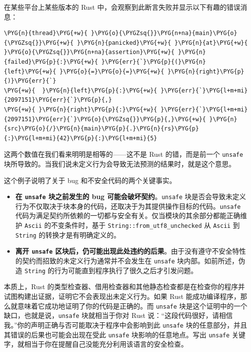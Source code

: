 在某些平台上某些版本的 Rust 中，会观察到此断言失败并显示以下有趣的错误消息：

\begin{Verbatim}[commandchars=\\\{\},breaklines=true,breakanywhere=true,fontsize=\codefont,xleftmargin=17bp]
\PYG{n}{thread}\PYG{+w}{ }\PYG{o}{\PYGZsq{}}\PYG{n+na}{main}\PYG{o}{\PYGZsq{}}\PYG{+w}{ }\PYG{n}{panicked}\PYG{+w}{ }\PYG{n}{at}\PYG{+w}{ }\PYG{o}{\PYGZsq{}}\PYG{n+na}{assertion}\PYG{+w}{ }\PYG{n}{failed}\PYG{p}{:}\PYG{+w}{ }\PYG{err}{`}\PYG{p}{(}\PYG{n}{left}\PYG{+w}{ }\PYG{o}{=}\PYG{o}{=}\PYG{+w}{ }\PYG{n}{right}\PYG{p}{)}\PYG{err}{`}
\PYG{+w}{  }\PYG{n}{left}\PYG{p}{:}\PYG{+w}{ }\PYG{err}{`}\PYG{l+m+mi}{2097151}\PYG{err}{`}\PYG{p}{,}
\PYG{+w}{ }\PYG{n}{right}\PYG{p}{:}\PYG{+w}{ }\PYG{err}{`}\PYG{l+m+mi}{2097151}\PYG{err}{`}\PYG{o}{\PYGZsq{}}\PYG{p}{,}\PYG{+w}{ }\PYG{n}{src}\PYG{o}{/}\PYG{n}{main}\PYG{p}{.}\PYG{n}{rs}\PYG{p}{:}\PYG{l+m+mi}{42}\PYG{p}{:}\PYG{l+m+mi}{5}
\end{Verbatim}

这两个数值在我们看来明明是相等的——这不是 Rust 的错，而是前一个 \texttt{unsafe} 块所导致的。当我们说未定义行为会导致无法预测的结果时，就是这个意思。

这个例子说明了关于 bug 和不安全代码的两个关键事实。

\begin{itemize}
\item \textbf{在 \texttt{unsafe} 块之前发生的 bug 可能会破坏契约}。\texttt{unsafe} 块是否会导致未定义行为不仅取决于块本身的代码，还取决于为其提供操作目标的代码。\texttt{unsafe} 代码为满足契约所依赖的一切都与安全有关。仅当模块的其余部分都能正确维护 \texttt{Ascii} 的不变条件时，基于 \texttt{String::from\_utf8\_unchecked} 从 \texttt{Ascii} 到 \texttt{String} 的转换才是有明确定义的。
\item \textbf{离开 \texttt{unsafe} 区块后，仍可能出现此处违约的后果}。由于没有遵守不安全特性的契约而招致的未定义行为通常并不会发生在 \texttt{unsafe} 块内部。如前所述，伪造 \texttt{String} 的行为可能直到程序执行了很久之后才引发问题。
\end{itemize}

本质上，Rust 的类型检查器、借用检查器和其他静态检查都是在检查你的程序并试图构建出证据，证明它不会表现出未定义行为。如果 Rust 能成功编译程序，那么就意味着它成功地证明了你的代码是正确的。而 \texttt{unsafe} 块是这个证明中的一个缺口，也就是说，\texttt{unsafe} 块就相当于你对 Rust 说：“这段代码很好，请相信我。”你的声明正确与否可能取决于程序中会影响到此 \texttt{unsafe} 块的任意部分，并且其错误的后果也可能会出现在受此 \texttt{unsafe} 块影响的任意地点。写出 \texttt{unsafe} 关键字，就相当于你在提醒自己没能充分利用该语言的安全检查。

